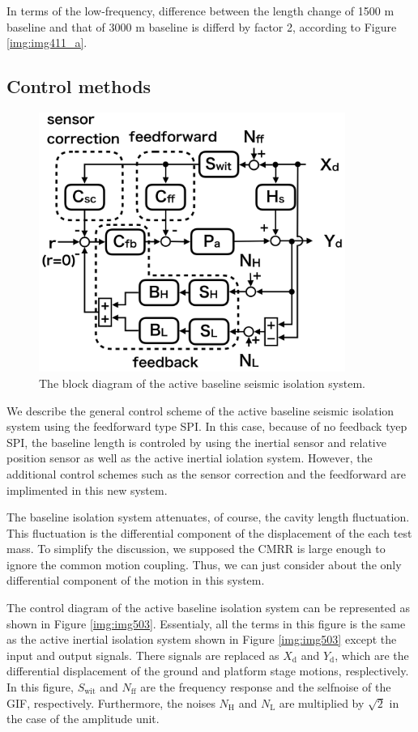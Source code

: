 In terms of the low-frequency, difference between the length change of 1500 m baseline and that of 3000 m baseline is differd by factor 2, according to Figure \ref{img:img411_a}.

\subsection{Control methods} \label{sec:444}
\begin{figure}[h]
  \begin{center}   
    \includegraphics[width=10cm]{./img_chap5/img511.png}
    \caption{The block diagram of the active baseline seismic isolation system.} \label{img:img511}
  \end{center}
\end{figure}
We describe the general control scheme of the active baseline seismic isolation system using the feedforward type SPI. In this case, because of no feedback tyep SPI, the baseline length is controled by using the inertial sensor and relative position sensor as well as the active inertial iolation system. However, the additional control schemes such as the sensor correction and the feedforward are implimented in this new system.

The baseline isolation system attenuates, of course, the cavity length fluctuation. This fluctuation is the differential component of the displacement of the each test mass. To simplify the discussion, we supposed the CMRR is large enough to ignore the common motion coupling. Thus, we can just consider about the only differential component of the motion in this system.

The control diagram of the active baseline isolation system can be represented as shown in Figure \ref{img:img503}. Essentialy, all the terms in this figure is the same as the active inertial isolation system shown in Figure \ref{img:img503} except the input and output signals. There signals are replaced as $X_{\mathrm{d}}$ and $Y_{\mathrm{d}}$, which are the differential displacement of the ground and platform stage motions, resplectively. In this figure,  $S_{\mathrm{wit}}$ and $N_{\mathrm{ff}}$ are the frequency response and the selfnoise of the GIF, respectively. Furthermore, the noises $N_{\mathrm{H}}$ and $N_{\mathrm{L}}$ are multiplied by $\sqrt{2}$ in the case of the amplitude unit.


